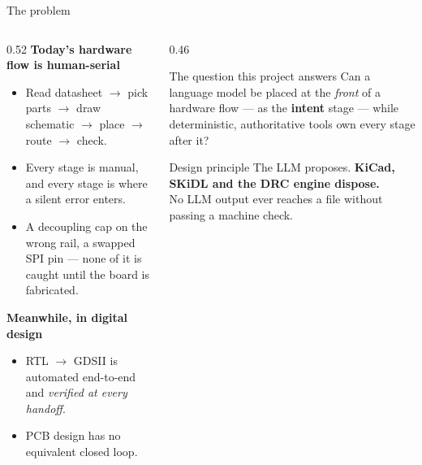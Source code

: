 \documentclass[aspectratio=169,10pt]{beamer}
\begin{document}
\begin{frame}{The problem}
\vspace{1mm}
\begin{columns}[T]
\begin{column}{0.52\textwidth}
\textbf{Today's hardware flow is human-serial}
\begin{itemize}\small
  \item Read datasheet $\rightarrow$ pick parts $\rightarrow$ draw schematic $\rightarrow$ place $\rightarrow$ route $\rightarrow$ check.
  \item Every stage is manual, and every stage is where a silent error enters.
  \item A decoupling cap on the wrong rail, a swapped SPI pin --- none of it is caught until the board is fabricated.
\end{itemize}
\vspace{2mm}
\textbf{Meanwhile, in digital design}
\begin{itemize}\small
  \item RTL $\rightarrow$ GDSII is automated end-to-end and \emph{verified at every handoff}.
  \item PCB design has no equivalent closed loop.
\end{itemize}
\end{column}
\begin{column}{0.46\textwidth}
\begin{block}{The question this project answers}
\small
Can a language model be placed at the \emph{front} of a hardware flow --- as the \textbf{intent} stage --- while deterministic, authoritative tools own every stage after it?
\end{block}
\vspace{2mm}
\begin{block}{Design principle}
\small
The LLM proposes. \textbf{KiCad, SKiDL and the DRC engine dispose.}\\[3pt]
No LLM output ever reaches a file without passing a machine check.
\end{block}
\end{column}
\end{columns}
\end{frame}
\end{document}
